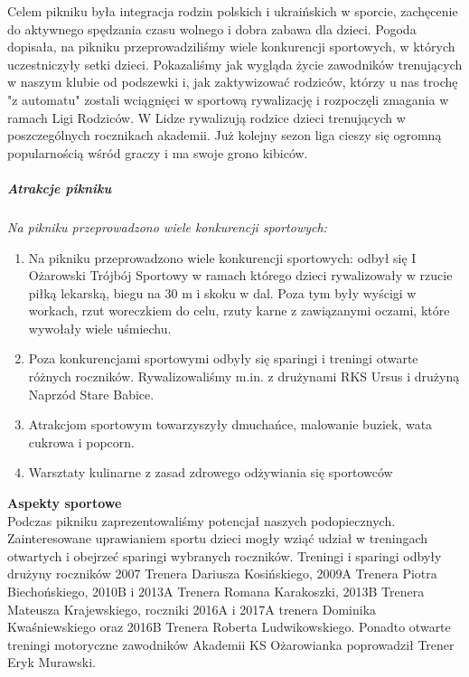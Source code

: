 \documentclass[14pt, letterpaper, titlepage]{article}
\begin{document}
Celem pikniku była integracja rodzin polskich i ukraińskich w sporcie, zachęcenie do aktywnego spędzania czasu wolnego i dobra zabawa dla dzieci. Pogoda dopisała, na pikniku przeprowadziliśmy wiele konkurencji sportowych, w których uczestniczyły setki dzieci. Pokazaliśmy jak wygląda życie zawodników trenujących w naszym klubie od podszewki i, jak zaktywizować rodziców, którzy u nas trochę "z automatu" zostali wciągnięci w sportową rywalizację i rozpoczęli zmagania w ramach Ligi Rodziców. W Lidze rywalizują rodzice dzieci trenujących w poszczególnych rocznikach akademii. Już kolejny sezon liga cieszy się ogromną popularnością wśród graczy i ma swoje grono kibiców.

\subparagraph{Atrakcje pikniku}
\textit{Na pikniku przeprowadzono wiele konkurencji sportowych:} 

\begin{enumerate}
\item Na pikniku przeprowadzono wiele konkurencji sportowych: odbył się I Ożarowski Trójbój Sportowy w ramach którego dzieci rywalizowały w rzucie piłką lekarską, biegu na 30 m i skoku w dal. Poza tym były wyścigi w workach, rzut woreczkiem do celu, rzuty karne z zawiązanymi oczami, które wywołały wiele uśmiechu.
\item Poza konkurencjami sportowymi odbyły się sparingi i treningi otwarte różnych roczników. Rywalizowaliśmy m.in. z drużynami RKS Ursus i drużyną Naprzód Stare Babice.
\item Atrakcjom sportowym towarzyszyły dmuchańce, malowanie buziek, wata cukrowa i popcorn.
\item Warsztaty kulinarne z zasad zdrowego odżywiania się sportowców
\end{enumerate}

\noindent
\textbf{Aspekty sportowe} \\

Podczas pikniku zaprezentowaliśmy potencjał naszych podopiecznych. Zainteresowane uprawianiem sportu dzieci mogły wziąć udział w treningach otwartych i obejrzeć sparingi wybranych roczników. Treningi i sparingi odbyły drużyny roczników 2007 Trenera Dariusza Kosińskiego, 2009A Trenera Piotra Biechońskiego, 2010B i 2013A Trenera Romana Karakoszki, 2013B Trenera Mateusza Krajewskiego, roczniki 2016A i 2017A trenera Dominika Kwaśniewskiego oraz 2016B Trenera Roberta Ludwikowskiego. Ponadto otwarte treningi motoryczne zawodników Akademii KS Ożarowianka poprowadził Trener Eryk Murawski.\\
\end{document}
